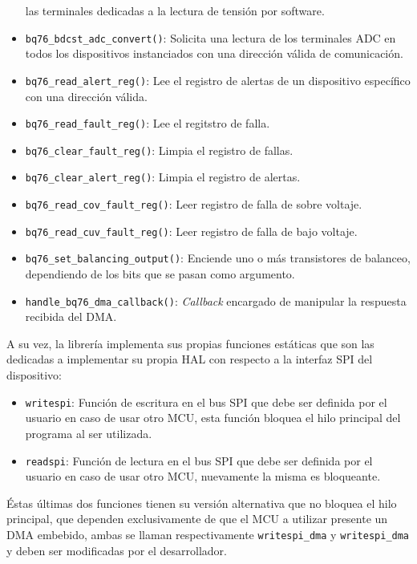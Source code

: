 \documentclass[10pt, a4paper]{article}
\begin{document}
\begin{itemize}
        las terminales dedicadas a la lectura de tensi\'on por software.
    \item \texttt{bq76\_bdcst\_adc\_convert()}: Solicita una lectura de los
        terminales \acrshort{ADC} en todos los dispositivos instanciados con una 
        dirección válida de comunicación.
    \item \texttt{bq76\_read\_alert\_reg()}: Lee el registro de alertas de un
        dispositivo espec\'ifico con una direcci\'on v\'alida.
    \item \texttt{bq76\_read\_fault\_reg()}: Lee el regitstro de falla.
    \item \texttt{bq76\_clear\_fault\_reg()}: Limpia el registro de fallas.
    \item \texttt{bq76\_clear\_alert\_reg()}: Limpia el registro de alertas.
    \item \texttt{bq76\_read\_cov\_fault\_reg()}: Leer registro de falla de sobre
        voltaje.
    \item \texttt{bq76\_read\_cuv\_fault\_reg()}: Leer registro de falla de bajo
        voltaje.
    \item \texttt{bq76\_set\_balancing\_output()}: Enciende uno o m\'as
        transistores de balanceo, dependiendo de los bits que se pasan como
        argumento.
    \item \texttt{handle\_bq76\_dma\_callback()}: \emph{Callback} encargado de
        manipular la respuesta recibida del \acrshort{DMA}.
\end{itemize}

A su vez, la librer\'ia implementa sus propias funciones est\'aticas que son las
dedicadas a implementar su propia \acrshort{HAL} con respecto a la interfaz
\acrshort{SPI} del dispositivo: 

\begin{itemize}
    \item \texttt{writespi}: Funci\'on de escritura en el bus \acrshort{SPI} que
        debe ser definida por el usuario en caso de usar otro \acrshort{MCU},
        esta funci\'on bloquea el hilo principal del programa al ser utilizada.
    \item \texttt{readspi}: Funci\'on de lectura en el bus \acrshort{SPI} que
        debe ser definida por el usuario en caso de usar otro \acrshort{MCU},
        nuevamente la misma es bloqueante.
\end{itemize}

\'Estas \'ultimas dos funciones tienen su versi\'on alternativa que no bloquea
el hilo principal, que dependen exclusivamente de que el \acrshort{MCU} a 
utilizar presente un \acrshort{DMA} embebido, ambas se llaman respectivamente
\texttt{writespi\_dma} y \texttt{writespi\_dma} y deben ser modificadas por el
desarrollador.
\end{document}
